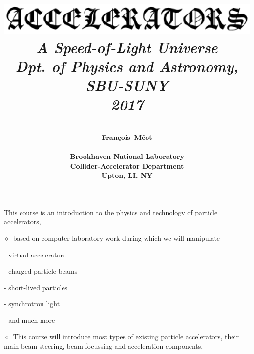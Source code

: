 \documentclass[12pt]{article}
\newcommand{\sid}{{\small \ensuremath{\diamond}}~}
\newcommand{\blue}{\color{blue}}
\begin{document}
\landscape

\title{
~ \\
\includegraphics[width=.9\linewidth]{accelerator.eps} \\
\fontsize{33pt}{34pt}\selectfont \it \blue
A Speed-of-Light Universe \\ Dpt. of Physics and Astronomy, SBU-SUNY \\ 2017 \\[5ex]
}



\author{ 
~
\\[5ex]
\fontsize{29pt}{34pt}\selectfont \bf
 Fran\c{c}ois~M\'eot \\
~ \\
\fontsize{29pt}{34pt}\selectfont \rm
Brookhaven National Laboratory \\
\fontsize{29pt}{34pt}\selectfont 
Collider-Accelerator Department \\
\fontsize{29pt}{34pt}\selectfont 
 Upton, LI, NY
}


\date{}


\thispagestyle{empty}

\maketitle








\clearpage

\fontsize{26pt}{28pt}\selectfont \bf


This course is an introduction  to the physics and technology of particle accelerators, 

\bigskip

\sid based on computer laboratory work during which we will  manipulate

 - virtual accelerators
 
 - charged  particle beams
 
- short-lived particles

 - synchrotron light

 - and much more

\bigskip

\sid This course will introduce  most types of existing particle  accelerators, their main 
beam steering, beam focussing and acceleration components, 
\end{document}
